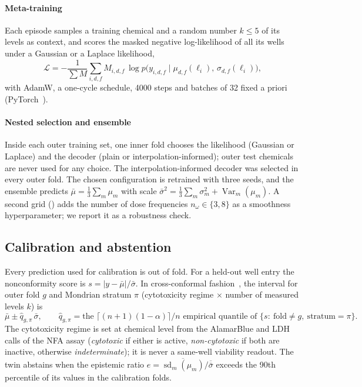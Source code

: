 \documentclass[11pt,a4paper]{article}
\newcommand{\file}[1]{\texttt{\detokenize{#1}}}
\begin{document}
\paragraph{Meta-training}
Each episode samples a training chemical and a random number \(k\le 5\) of its levels as context, and scores the
masked negative log-likelihood of all its wells under a Gaussian or a Laplace likelihood,
\begin{equation}\label{eq:loss}
  \mathcal{L}=-\frac{1}{\sum M}\sum_{i,d,f} M_{i,d,f}\,\log p\big(y_{i,d,f}\mid\mu_{d,f}(\ell_i),\,\sigma_{d,f}(\ell_i)\big),
\end{equation}
with AdamW, a one-cycle schedule, 4000 steps and batches of 32 fixed a priori (PyTorch~\cite{paszke2019pytorch}).

\paragraph{Nested selection and ensemble}
Inside each outer training set, one inner fold chooses the likelihood (Gaussian or Laplace) and the decoder
(plain or interpolation-informed); outer test chemicals are never used for any choice. The interpolation-informed
decoder was selected in every outer fold. The chosen configuration is retrained with three seeds, and the
ensemble predicts
\(\bar\mu=\tfrac13\sum_m\mu_m\) with scale \(\bar\sigma^2=\tfrac13\sum_m\sigma_m^2+\operatorname{Var}_m(\mu_m)\).
A second grid (\file{v2}) adds the number of dose frequencies \(n_\omega\in\{ 3, 8 \}\) as a smoothness
hyperparameter; we report it as a robustness check.

\subsection{Calibration and abstention}
Every prediction used for calibration is out of fold. For a held-out well entry the nonconformity score is
\(s=|y-\bar\mu|/\bar\sigma\). In cross-conformal
fashion~\cite{vovk2015cross,vovk2022algorithmic,lei2018distribution,angelopoulos2023conformal}, the interval for
outer fold \(g\) and Mondrian stratum \(\pi\) (cytotoxicity regime \(\times\) number of measured levels \(k\)) is
\begin{equation}\label{eq:conformal}
  \bar\mu\pm\hat q_{g,\pi}\,\bar\sigma,\qquad
  \hat q_{g,\pi}=\text{the }\big\lceil (n+1)(1-\alpha)\big\rceil/n\text{ empirical quantile of }\{s:\ \text{fold}\neq g,\ \text{stratum}=\pi\}.
\end{equation}
The cytotoxicity regime is set at chemical level from the AlamarBlue and LDH calls of the NFA assay
(\emph{cytotoxic} if either is active, \emph{non-cytotoxic} if both are inactive, otherwise
\emph{indeterminate}); it is never a same-well viability readout. The twin abstains when the epistemic ratio
\(e=\overline{\operatorname{sd}_m(\mu_m)}/\overline{\bar\sigma}\) exceeds the 90th percentile of its values in
the calibration folds.
\end{document}
